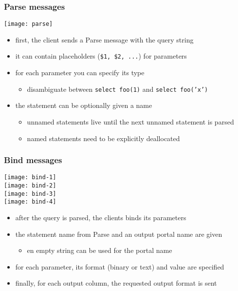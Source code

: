 \documentclass{beamer}
\begin{document}
\begin{frame}
  \frametitle{Parse messages}

  \begin{center}
    \texttt{[image: parse]}
  \end{center}

  \begin{itemize}
  \item first, the client sends a Parse message with the query string
  \item it can contain placeholders (\texttt{\$1, \$2, ...}) for parameters
  \item for each parameter you can specify its type
    \begin{itemize}
    \item disambiguate between \texttt{select foo(1)} and \texttt{select foo('x')}
    \end{itemize}
  \item the statement can be optionally given a name
    \begin{itemize}
    \item unnamed statements live until the next unnamed statement is parsed
    \item named statements need to be explicitly deallocated
    \end{itemize}
  \end{itemize}
\end{frame}

\begin{frame}
  \frametitle{Bind messages}

  \hspace{2cm}\texttt{[image: bind-1]}\;\raisebox{0.2cm}{$+$} \\
  \hspace{2cm}\texttt{[image: bind-2]}\;\raisebox{0.2cm}{$+$} \\
  \hspace{2cm}\texttt{[image: bind-3]}\;\raisebox{0.2cm}{$+$} \\
  \hspace{2cm}\texttt{[image: bind-4]}

  \begin{itemize}
  \item after the query is parsed, the clients binds its parameters
  \item the statement name from Parse and an output portal name are given
    \begin{itemize}
    \item en empty string can be used for the portal name
    \end{itemize}
  \item for each parameter, its format (binary or text) and value are specified
  \item finally, for each output column, the requested output format is sent
  \end{itemize}
\end{frame}
\end{document}
